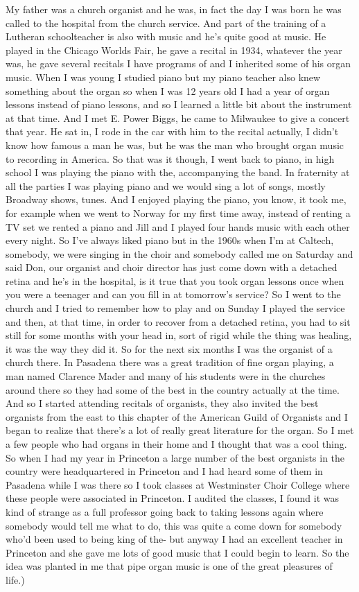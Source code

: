 \documentclass[]{article}
\begin{document}
My father was a church organist and he was, in fact the day I was born
he was called to the hospital from the church service. And part of the
training of a Lutheran schoolteacher is also with music and he's quite
good at music. He played in the Chicago Worlds Fair, he gave a recital
in 1934, whatever the year was, he gave several recitals I have programs
of and I inherited some of his organ music. When I was young I studied
piano but my piano teacher also knew something about the organ so when I
was 12 years old I had a year of organ lessons instead of piano lessons,
and so I learned a little bit about the instrument at that time. And I
met E. Power Biggs, he came to Milwaukee to give a concert that year. He
sat in, I rode in the car with him to the recital actually, I didn't
know how famous a man he was, but he was the man who brought organ music
to recording in America. So that was it though, I went back to piano, in
high school I was playing the piano with the, accompanying the band. In
fraternity at all the parties I was playing piano and we would sing a
lot of songs, mostly Broadway shows, tunes. And I enjoyed playing the
piano, you know, it took me, for example when we went to Norway for my
first time away, instead of renting a TV set we rented a piano and Jill
and I played four hands music with each other every night. So I've
always liked piano but in the 1960s when I'm at Caltech, somebody, we
were singing in the choir and somebody called me on Saturday and said
Don, our organist and choir director has just come down with a detached
retina and he's in the hospital, is it true that you took organ lessons
once when you were a teenager and can you fill in at tomorrow's service?
So I went to the church and I tried to remember how to play and on
Sunday I played the service and then, at that time, in order to recover
from a detached retina, you had to sit still for some months with your
head in, sort of rigid while the thing was healing, it was the way they
did it. So for the next six months I was the organist of a church there.
In Pasadena there was a great tradition of fine organ playing, a man
named Clarence Mader and many of his students were in the churches
around there so they had some of the best in the country actually at the
time. And so I started attending recitals of organists, they also
invited the best organists from the east to this chapter of the American
Guild of Organists and I began to realize that there's a lot of really
great literature for the organ. So I met a few people who had organs in
their home and I thought that was a cool thing. So when I had my year in
Princeton a large number of the best organists in the country were
headquartered in Princeton and I had heard some of them in Pasadena
while I was there so I took classes at Westminster Choir College where
these people were associated in Princeton. I audited the classes, I
found it was kind of strange as a full professor going back to taking
lessons again where somebody would tell me what to do, this was quite a
come down for somebody who'd been used to being king of the- but anyway
I had an excellent teacher in Princeton and she gave me lots of good
music that I could begin to learn. So the idea was planted in me that
pipe organ music is one of the great pleasures of life.)
\end{document}
